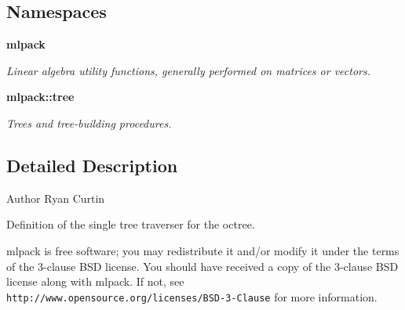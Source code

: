 \subsection*{Namespaces}
\begin{DoxyCompactItemize}
\item 
 \textbf{ mlpack}
\begin{DoxyCompactList}\small\item\em Linear algebra utility functions, generally performed on matrices or vectors. \end{DoxyCompactList}\item 
 \textbf{ mlpack\+::tree}
\begin{DoxyCompactList}\small\item\em Trees and tree-\/building procedures. \end{DoxyCompactList}\end{DoxyCompactItemize}


\subsection{Detailed Description}
\begin{DoxyAuthor}{Author}
Ryan Curtin
\end{DoxyAuthor}
Definition of the single tree traverser for the octree.

mlpack is free software; you may redistribute it and/or modify it under the terms of the 3-\/clause B\+SD license. You should have received a copy of the 3-\/clause B\+SD license along with mlpack. If not, see {\tt http\+://www.\+opensource.\+org/licenses/\+B\+S\+D-\/3-\/\+Clause} for more information. 